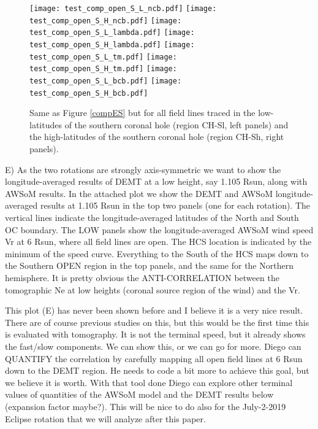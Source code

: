 \documentclass[namedreferences]{solarphysics}
\begin{document}
\begin{article}
\begin{figure}[ht!]
\begin{center}
\texttt{[image: test\_comp\_open\_S\_L\_ncb.pdf]}
\texttt{[image: test\_comp\_open\_S\_H\_ncb.pdf]}
\texttt{[image: test\_comp\_open\_S\_L\_lambda.pdf]}
\texttt{[image: test\_comp\_open\_S\_H\_lambda.pdf]}
\texttt{[image: test\_comp\_open\_S\_L\_tm.pdf]}
\texttt{[image: test\_comp\_open\_S\_H\_tm.pdf]}
\texttt{[image: test\_comp\_open\_S\_L\_bcb.pdf]}
\texttt{[image: test\_comp\_open\_S\_H\_bcb.pdf]}
\caption{Same as Figure \ref{compES} but for all field lines traced in the low-latitudes of the southern coronal hole (region CH-Sl, left panels) and the high-latitudes of the southern coronal hole (region CH-Sh, right panels).}
\label{compCH}
\end{center}
\end{figure} 




E) As the two rotations are strongly axis-symmetric we want to show the longitude-averaged results of DEMT at a low height, say 1.105 Rsun, along with AWSoM results. In the attached plot we show the DEMT and AWSoM longitude-averaged results at 1.105 Rsun in the top two panels (one for each rotation). The vertical lines indicate the longitude-averaged latitudes of the North and South OC boundary. The LOW panels show the longitude-averaged AWSoM wind speed Vr at 6 Rsun, where all field lines are open. The HCS location is indicated by the minimum of the speed curve. Everything to the South of the HCS maps down to the Southern OPEN region in the top panels, and the same for the Northern hemisphere. It is pretty obvious the ANTI-CORRELATION between the tomographic Ne at low heights (coronal source region of the wind) and the Vr.

This plot (E) has never been shown before and I believe it is a very nice result. There are of course previous studies on this, but this would be the first time this is evaluated with tomography. It is not the terminal speed, but it already shows the fast/slow components. We can show this, or we can go for more. Diego can QUANTIFY the correlation by carefully mapping all open field lines at 6 Rsun down to the DEMT region. He needs to code a bit more to achieve this goal, but we believe it is worth. With that tool done Diego can explore other terminal values of quantities of the AWSoM model and the DEMT results below (expansion factor maybe?). This will be nice to do also for the July-2-2019 Eclipse rotation that we will analyze after this paper. 





\end{article}
\end{document}
